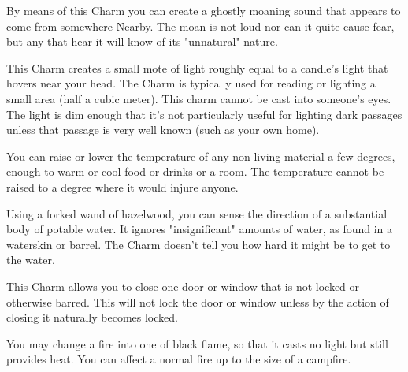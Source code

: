 




  \cbreak



  By means of this Charm you can create a ghostly moaning sound that appears to come from somewhere Nearby. The moan is not loud nor can it quite cause fear, but any that hear it will know of its "unnatural" nature. 


  This Charm creates a small mote of light roughly equal to a candle's light that hovers near your head. The Charm is typically used for reading or lighting a small area (half a cubic meter). This charm cannot be cast into someone's eyes. The light is dim enough that it's not particularly useful for lighting dark passages unless that passage is very well known (such as your own home). 


  You can raise or lower the temperature of any non-living material a few degrees, enough to warm or cool food or drinks or a room.  The temperature cannot be raised to a degree where it would injure anyone.



  Using a forked wand of hazelwood, you can sense the direction of a substantial body of potable water.  It ignores "insignificant" amounts of water, as found in a waterskin or barrel.  The Charm doesn't tell you how hard it might be to get to the water.


  This Charm allows you to close one door or window that is not locked or otherwise barred. This will not lock the door or window unless by the action of closing it naturally becomes locked. 


  You may change a fire into one of black flame, so that it casts no light but still provides heat.  You can affect a normal fire up to the size of a campfire.


